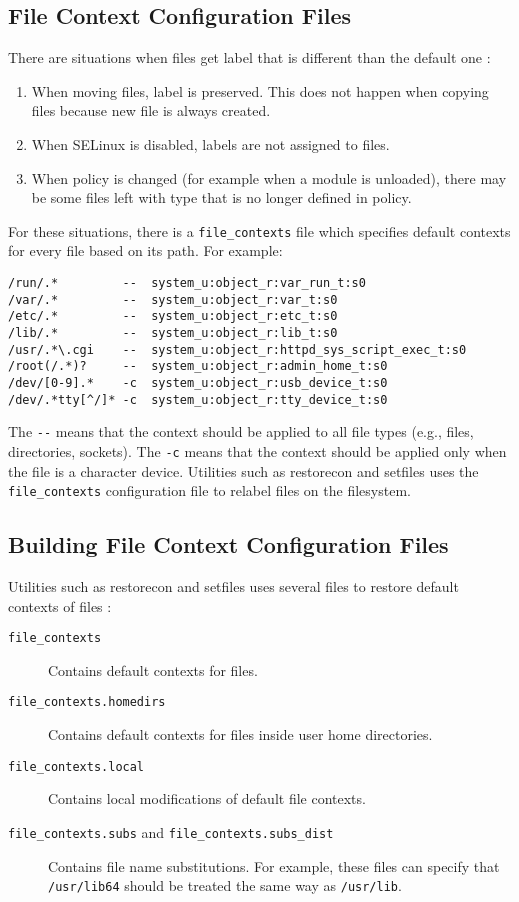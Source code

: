 \subsection{File Context Configuration Files}
There are situations when files get label that is different than the default
one \cite{selinuxguide}:
\begin{enumerate}
    \item When moving files, label is preserved. This does not happen when
        copying files because new file is always created.
    \item When SELinux is disabled, labels are not assigned to files.
    \item When policy is changed (for example when a module is unloaded), there
        may be some files left with type that is no longer defined in policy.
\end{enumerate}
For these situations, there is a \texttt{file\_contexts} file which specifies
default contexts for every file based on its path. For example:
\begin{lstlisting}
/run/.*         --  system_u:object_r:var_run_t:s0
/var/.*	        --  system_u:object_r:var_t:s0
/etc/.*	        --  system_u:object_r:etc_t:s0
/lib/.*	        --  system_u:object_r:lib_t:s0
/usr/.*\.cgi    --  system_u:object_r:httpd_sys_script_exec_t:s0
/root(/.*)?     --  system_u:object_r:admin_home_t:s0
/dev/[0-9].*    -c  system_u:object_r:usb_device_t:s0
/dev/.*tty[^/]* -c  system_u:object_r:tty_device_t:s0
\end{lstlisting}
The \texttt{-{}-} means that the context should be applied to all file types
(e.g., files, directories, sockets). The \texttt{-c} means that the context
should be applied only when the file is a character device. Utilities such as
restorecon and setfiles uses the \texttt{file\_contexts} configuration file to
relabel files on the filesystem.

\subsection{Building File Context Configuration Files}
Utilities such as restorecon and setfiles uses several files to
restore default contexts of files \cite[pp.~165--167]{tsn}:
\begin{description}
    \item [\texttt{file\_contexts}] Contains default contexts for files.
    \item [\texttt{file\_contexts.homedirs}] Contains default contexts for files
        inside user home directories.
    \item [\texttt{file\_contexts.local}] Contains local modifications of
        default file contexts.
    \item [\texttt{file\_contexts.subs} and \texttt{file\_contexts.subs\_dist}]
        Contains file name substitutions. For example, these files can specify
        that \texttt{/usr/lib64} should be treated the same way as
        \texttt{/usr/lib}.
\end{description}

